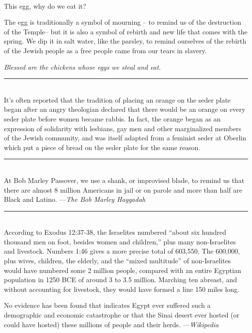 \documentclass[letter,11pt,openany]{memoir}
\newcommand{\HgInst}[1]{{
\noindent\sffamily{\bfseries{#1}}}}
\newcommand{\HgSource}[1]{\hfill{\small---\itshape{#1}}}
\newcommand{\HgFill}{
\vfill \hrule 
\vfill}
\newenvironment{HgEnglish}{\strut\\
\noindent}{\vspace{1em}}
\newcommand{\SSrc}{\textsuperscript{\upshape{[S]}}}
\begin{document}
\HgInst{Hold up the egg, and ask:} 
\begin{HgEnglish}
	This egg, why do we eat it?
	
	The egg is traditionally a symbol of mourning -- to remind us of the destruction of the Temple-- but it is also a symbol of rebirth and new life that comes with the spring. We dip it in salt water, like the parsley, to remind ourselves of the rebirth of the Jewish people as a free people came from our tears in slavery.
	
	{\itshape Blessed are the chickens whose eggs we steal and eat.} \SSrc 
\end{HgEnglish}

\HgFill
\begin{HgEnglish}
	It's often reported that the tradition of placing an orange on the seder plate began after an angry theologian declared that there would be an orange on every seder plate before women became rabbis. In fact, the orange began as an expression of solidarity with lesbians, gay men and other marginalized members of the Jewish community, and was itself adapted from a feminist seder at Oberlin which put a piece of bread on the seder plate for the same reason. 
\end{HgEnglish}

\HgFill
\begin{HgEnglish}
	At Bob Marley Passover, we use a shank, or improvised blade, to remind us that there are almost 8 million Americans in jail or on parole and more than half are Black and Latino. \HgSource{The Bob Marley Haggadah} 
\end{HgEnglish}

\HgFill
\begin{HgEnglish}
	According to Exodus 12:37-38, the Israelites numbered ``about six hundred thousand men on foot, besides women and children,'' plus many non-Israelites and livestock. Numbers 1:46 gives a more precise total of 603,550. The 600,000, plus wives, children, the elderly, and the ``mixed multitude'' of non-Israelites would have numbered some 2 million people, compared with an entire Egyptian population in 1250 BCE of around 3 to 3.5 million. Marching ten abreast, and without accounting for livestock, they would have formed a line 150 miles long.
	
	No evidence has been found that indicates Egypt ever suffered such a demographic and economic catastrophe or that the Sinai desert ever hosted (or could have hosted) these millions of people and their herds. \HgSource{Wikipedia} 
\end{HgEnglish}
\end{document}
